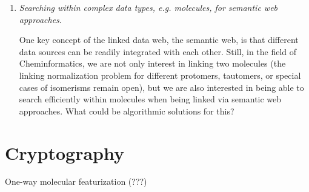 \documentclass{sig-alternate}
\begin{document}
\begin{enumerate}
\item \emph{Searching within complex data types, e.g. molecules, for semantic web approaches}.

One key concept of the linked data web, the semantic web, is that different data sources can be readily integrated with each other. Still, in the field
of Cheminformatics, we are not only interest in linking two molecules 
(the linking normalization problem for different protomers, tautomers, or special cases of isomerisms remain open), but we
are also interested in being able to search efficiently within molecules when being linked via semantic web approaches.
What could be algorithmic solutions for this?
\end{enumerate}

\section*{Cryptography}
One-way molecular featurization (???)
\end{document}
